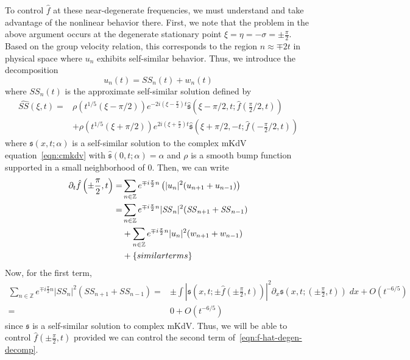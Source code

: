 \documentclass[letterpaper, reqno,final]{amsart}
\newcommand{\bbZ}{\mathbb{Z}}
\newcommand{\fs}{\mathfrak{s}}
\newcommand{\fhPi}{\frac{\pi}{2}}
\newcommand{\mSS}{\mathit{SS}}
\newcommand{\bigO}[1]{O\left({#1}\right)}
\newcommand{\btext}[1]{\left\{\textup{#1}\right\}}
\newcommand{\bsim}{\btext{similar terms}}
\begin{document}
To control $\hat{f}$ at these near-degenerate frequencies, we must understand and take advantage of the nonlinear behavior there.  First, we note that the problem in the above argument occurs at the degenerate stationary point $\xi = \eta = -\sigma = \pm \fhPi$.  Based on the group velocity relation, this corresponds to the region $n \approx \mp 2t$ in physical space where $u_n$ exhibits self-similar behavior.  Thus, we introduce the decomposition
\begin{equation*}
    u_n(t) = \mSS_n(t) + w_n(t)
\end{equation*}
where $\mSS_n(t)$ is the approximate self-similar solution defined by
\begin{equation}\label{eqn:mSS-def-intro}\begin{split}
    \widehat{\mSS}(\xi, t) =& \rho(t^{1/5} (\xi - \pi/2)) e^{-2i(\xi - \fhPi) t}\hat{\fs}(\xi - \pi/2,t;\hat{f}(\fhPi/2,t))\\
    &+ \rho(t^{1/5} (\xi + \pi/2)) e^{2i(\xi + \fhPi) t}\hat{\fs}(\xi + \pi/2,-t;\hat{f}(-\fhPi/2,t))
\end{split}\end{equation}
where $\fs(x,t;\alpha)$ is a self-similar solution to the complex mKdV equation~\eqref{eqn:cmkdv} with $\hat{\fs}(0,t;\alpha) = \alpha$ and $\rho$ is a smooth bump function supported in a small neighborhood of $0$.  Then, we can write
\begin{equation}\label{eqn:f-hat-degen-decomp}\begin{split}
    \partial_t \hat{f}\left(\pm \fhPi, t\right) =& \sum_{n \in \bbZ} e^{\mp i\fhPi n} \left(|u_n|^2 (u_{n+1} + u_{n-1})\right)\\
    =& \sum_{n \in \bbZ} e^{\mp i\frac{\pi}{2}n} |\mSS_n|^2(\mSS_{n+1} + \mSS_{n-1})\\
    &+ \sum_{n \in \bbZ} e^{\mp i \fhPi n} |u_n|^2 (w_{n+1} + w_{n-1})\\
    &+ \bsim
\end{split}\end{equation}
Now, for the first term, 
\begin{equation*}\begin{split}
    \sum_{n \in \bbZ} e^{\mp i\frac{\pi}{2}n} |\mSS_n|^2(\mSS_{n+1} + \mSS_{n-1}) =& \pm \int |\fs\left(x,t; \pm \hat{f}\left(\pm \fhPi,t\right)\right)|^2 \partial_x \fs\left(x,t;\left(\pm \fhPi,t\right)\right)\;dx + \bigO{t^{-6/5}}\\
    =& 0 + \bigO{t^{-6/5}}
\end{split}\end{equation*}
since $\fs$ is a self-similar solution to complex mKdV.  Thus, we will be able to control $\hat{f}(\pm \fhPi, t)$ provided we can control the second term of~\eqref{eqn:f-hat-degen-decomp}.
\end{document}

